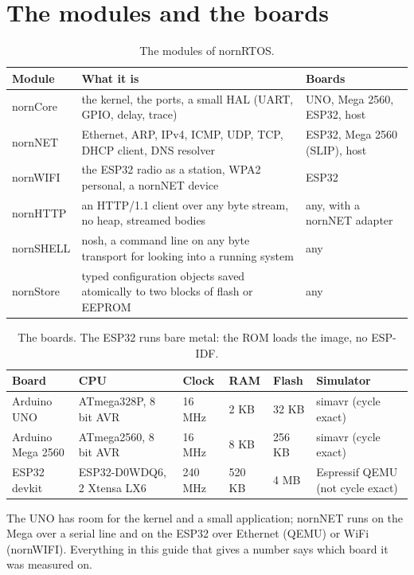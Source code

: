 \section{The modules and the boards}

\begin{table}[htbp]
\centering\small
\begin{tabular}{@{}lll@{}}
\toprule
Module & What it is & Boards \\
\midrule
nornCore & the kernel, the ports, a small HAL (UART, GPIO, delay, trace) & UNO, Mega 2560, ESP32, host \\
nornNET  & Ethernet, ARP, IPv4, ICMP, UDP, TCP, DHCP client, DNS resolver & ESP32, Mega 2560 (SLIP), host \\
nornWIFI & the ESP32 radio as a station, WPA2 personal, a nornNET device & ESP32 \\
nornHTTP & an HTTP/1.1 client over any byte stream, no heap, streamed bodies & any, with a nornNET adapter \\
nornSHELL & nosh, a command line on any byte transport for looking into a running system & any \\
nornStore & typed configuration objects saved atomically to two blocks of flash or EEPROM & any \\
\bottomrule
\end{tabular}
\caption{The modules of nornRTOS.}
\end{table}

\begin{table}[htbp]
\centering\small
\begin{tabular}{@{}llllll@{}}
\toprule
Board & CPU & Clock & RAM & Flash & Simulator \\
\midrule
Arduino UNO      & ATmega328P, 8 bit AVR     & 16 MHz  & 2 KB   & 32 KB   & simavr (cycle exact) \\
Arduino Mega 2560 & ATmega2560, 8 bit AVR    & 16 MHz  & 8 KB   & 256 KB  & simavr (cycle exact) \\
ESP32 devkit     & ESP32-D0WDQ6, 2 Xtensa LX6 & 240 MHz & 520 KB & 4 MB    & Espressif QEMU (not cycle exact) \\
\bottomrule
\end{tabular}
\caption{The boards. The ESP32 runs bare metal: the ROM loads the image, no ESP-IDF.}
\label{tab:boards}
\end{table}

The UNO has room for the kernel and a small application; nornNET runs on the Mega over
a serial line and on the ESP32 over Ethernet (QEMU) or WiFi (nornWIFI). Everything in this
guide that gives a number says which board it was measured on.

